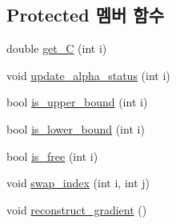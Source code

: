 \subsection*{Protected 멤버 함수}
\begin{DoxyCompactItemize}
\item 
double \hyperlink{class_solver_ae55a8581815436d13e760dadaec34e2a}{get\+\_\+\+C} (int i)
\item 
void \hyperlink{class_solver_a5a978b4ff9b60b2d75e54970fd6a2c20}{update\+\_\+alpha\+\_\+status} (int i)
\item 
bool \hyperlink{class_solver_a98d878b13d6f710fcaa0b16e657a37b6}{is\+\_\+upper\+\_\+bound} (int i)
\item 
bool \hyperlink{class_solver_a5876eedb0a6de6954f6037af0992cbed}{is\+\_\+lower\+\_\+bound} (int i)
\item 
bool \hyperlink{class_solver_a7b5e230875b8b5f06150ff0690e36b47}{is\+\_\+free} (int i)
\item 
void \hyperlink{class_solver_a043f498c1dda0122859d03f9cd07dc08}{swap\+\_\+index} (int i, int j)
\item 
void \hyperlink{class_solver_a7e34992ede606a336606ae54f6e963e6}{reconstruct\+\_\+gradient} ()
\end{DoxyCompactItemize}
